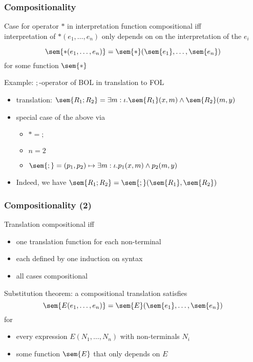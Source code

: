 \begin{frame}\frametitle{Compositionality}
Case for operator $*$ in interpretation function compositional iff \\
interpretation of $*(e_1,\ldots,e_n)$ only depends on on the interpretation of the $e_i$

\[\sem{*(e_1,\ldots,e_n)}=\sem{*}(\sem{e_1},\ldots,\sem{e_n})\]
for some function $\sem{*}$
\bigskip

Example: $;$-operator of BOL in translation to FOL
\begin{itemize}
 \item translation: $\sem{R_1 ; R_2}= \exists m:\iota.\sem{R_1}(x,m)\wedge \sem{R_2}(m,y)$
 \item special case of the above via
  \begin{itemize}
  \item $*=;$
  \item $n=2$
  \item $\sem{;}=(p_1,p_2)\mapsto \exists m:\iota.p_1(x,m)\wedge p_2(m,y)$
  \end{itemize}
 \item Indeed, we have $\sem{R_1;R_2}=\sem{;}(\sem{R_1},\sem{R_2})$
\end{itemize}
\end{frame}


\begin{frame}\frametitle{Compositionality (2)}
Translation compositional iff
\begin{itemize}
\item one translation function for each non-terminal
\item each defined by one induction on syntax
\item all cases compositional
\end{itemize}
\bigskip

Substitution theorem: a compositional translation satisfies
\[\sem{E(e_1,\ldots,e_n)}=\sem{E}(\sem{e_1},\ldots,\sem{e_n})\]
for
\begin{itemize}
\item every expression $E(N_1,\ldots,N_n)$ with non-terminals $N_i$
\item some function $\sem{E}$ that only depends on $E$
\end{itemize}
\end{frame}


